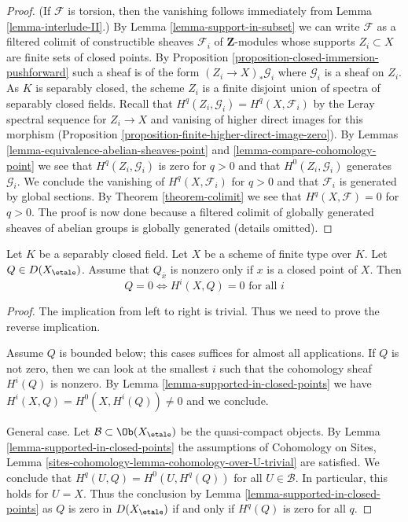 \begin{proof}
(If $\mathcal{F}$ is torsion, then the vanishing follows immediately
from Lemma \ref{lemma-interlude-II}.)
By Lemma \ref{lemma-support-in-subset} we can write $\mathcal{F}$
as a filtered colimit of constructible sheaves $\mathcal{F}_i$
of $\mathbf{Z}$-modules whose supports $Z_i \subset X$ are finite
sets of closed points. By
Proposition \ref{proposition-closed-immersion-pushforward}
such a sheaf is of the form $(Z_i \to X)_*\mathcal{G}_i$
where $\mathcal{G}_i$ is a sheaf on $Z_i$. As $K$ is separably closed,
the scheme $Z_i$ is a finite disjoint union of spectra of separably closed
fields. Recall that $H^q(Z_i, \mathcal{G}_i) = H^q(X, \mathcal{F}_i)$
by the Leray spectral sequence for $Z_i \to X$ and vanising of higher
direct images for this morphism
(Proposition \ref{proposition-finite-higher-direct-image-zero}).
By Lemmas \ref{lemma-equivalence-abelian-sheaves-point} and
\ref{lemma-compare-cohomology-point}
we see that $H^q(Z_i, \mathcal{G}_i)$ is zero for $q > 0$
and that $H^0(Z_i, \mathcal{G}_i)$ generates $\mathcal{G}_i$.
We conclude the vanishing of $H^q(X, \mathcal{F}_i)$ for $q > 0$
and that $\mathcal{F}_i$ is generated by global sections.
By Theorem \ref{theorem-colimit} we see that
$H^q(X, \mathcal{F}) = 0$ for $q > 0$.
The proof is now done because a
filtered colimit of globally generated sheaves of abelian groups
is globally generated (details omitted).
\end{proof}

\begin{lemma}
\label{lemma-vanishing-closed-points}
Let $K$ be a separably closed field. Let $X$ be a scheme of finite
type over $K$. Let $Q \in D(X_\etale)$. Assume that $Q_{\overline{x}}$
is nonzero only if $x$ is a closed point of $X$. Then
$$
Q = 0 \Leftrightarrow H^i(X, Q) = 0 \text{ for all }i
$$
\end{lemma}

\begin{proof}
The implication from left to right is trivial. Thus we need
to prove the reverse implication.

\medskip\noindent
Assume $Q$ is bounded below; this cases suffices for almost all
applications. If $Q$ is not zero, then we can look at the smallest $i$
such that the cohomology sheaf $H^i(Q)$ is nonzero.
By Lemma \ref{lemma-supported-in-closed-points} we have
$H^i(X, Q) = H^0(X, H^i(Q)) \not = 0$ and we conclude.

\medskip\noindent
General case. Let $\mathcal{B} \subset \Ob(X_\etale)$ be the
quasi-compact objects. By Lemma \ref{lemma-supported-in-closed-points}
the assumptions of Cohomology on Sites, Lemma
\ref{sites-cohomology-lemma-cohomology-over-U-trivial}
are satisfied. We conclude that $H^q(U, Q) = H^0(U, H^q(Q))$
for all $U \in \mathcal{B}$. In particular, this holds for $U = X$.
Thus the conclusion by Lemma \ref{lemma-supported-in-closed-points}
as $Q$ is zero in $D(X_\etale)$ if and only if $H^q(Q)$ is zero
for all $q$.
\end{proof}

